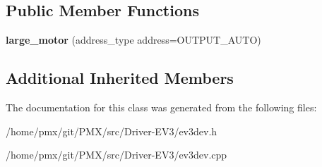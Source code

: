 \subsection*{Public Member Functions}
\begin{DoxyCompactItemize}
\item 
\mbox{\label{classev3dev_1_1large__motor_ada8e258ebd6be51eb7c89ae0102b8159}} 
{\bfseries large\+\_\+motor} (address\+\_\+type address=O\+U\+T\+P\+U\+T\+\_\+\+A\+U\+TO)
\end{DoxyCompactItemize}
\subsection*{Additional Inherited Members}


The documentation for this class was generated from the following files\+:\begin{DoxyCompactItemize}
\item 
/home/pmx/git/\+P\+M\+X/src/\+Driver-\/\+E\+V3/ev3dev.\+h\item 
/home/pmx/git/\+P\+M\+X/src/\+Driver-\/\+E\+V3/ev3dev.\+cpp\end{DoxyCompactItemize}
